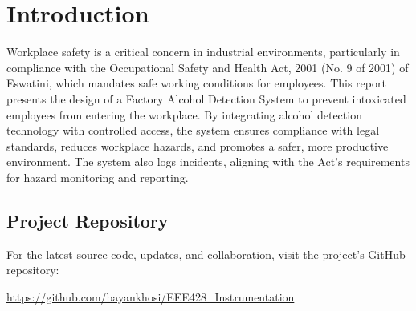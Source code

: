 \section{Introduction}
\label{chap:introduction}
Workplace safety is a critical concern in industrial environments, particularly in compliance with the Occupational Safety and Health Act, 2001 (No. 9 of 2001) of Eswatini, which mandates safe working conditions for employees\cite{eswatini_osh_act}. This report presents the design of a Factory Alcohol Detection System to prevent intoxicated employees from entering the workplace. By integrating alcohol detection technology with controlled access, the system ensures compliance with legal standards, reduces workplace hazards, and promotes a safer, more productive environment. The system also logs incidents, aligning with the Act's requirements for hazard monitoring and reporting.
\subsection{Project Repository}
For the latest source code, updates, and collaboration, visit the project's GitHub repository:
\begin{center}
    \url{https://github.com/bayankhosi/EEE428_Instrumentation}
\end{center}
